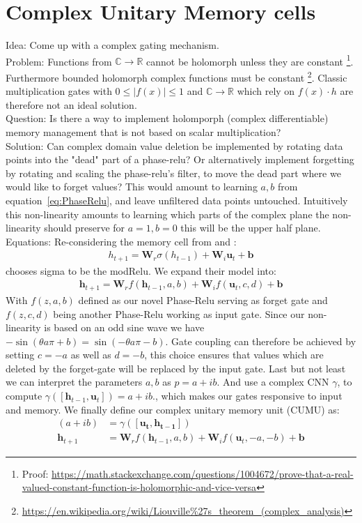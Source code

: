 \documentclass{article}
\begin{document}
\section{Complex Unitary Memory cells}
Idea: Come up with a complex gating mechanism. \\
Problem: Functions from $\mathbb{C} \rightarrow \mathbb{R}$ cannot be holomorph unless they are constant \cite[page 9]{Bornemann}\footnote{Proof: \url{https://math.stackexchange.com/questions/1004672/prove-that-a-real-valued-constant-function-is-holomorphic-and-vice-versa}}. Furthermore bounded holomorph complex functions must be constant \cite[page 38]{Bornemann}\footnote{\url{https://en.wikipedia.org/wiki/Liouville\%27s\_theorem\_(complex\_analysis)}}.
Classic multiplication gates with $0 \leq |f(x)| \leq 1$ and $\mathbb{C} \rightarrow \mathbb{R}$ which rely on $f(x) \cdot h$ are therefore not an ideal solution. \\
Question: Is there a way to implement holomporph (complex differentiable) memory management that is not based on scalar multiplication? \\
Solution: Can complex domain value deletion be implemented by rotating data points into the "dead" part of a phase-relu? Or alternatively implement forgetting by rotating and scaling the phase-relu's filter, to move the dead part where we would like to forget values? This would amount to learning $a,b$ from equation~\ref{eq:PhaseRelu}, and leave unfiltered data points untouched.
Intuitively this non-linearity amounts to learning which parts of the complex plane the non-linearity should preserve for $a=1, b=0$ this will be the upper half plane. \\
Equations:
Re-considering the memory cell from \cite{Pascanu} and \cite{Arjovsky}:
\begin{align}
h_{t+1} = \mathbf{W}_{r}\sigma(h_{t-1}) + \mathbf{W}_{i} \mathbf{u}_t + \mathbf{b}\end{align}
\cite{Arjovsky} chooses sigma to be the modRelu. We expand their model into:
\begin{align}
\mathbf{h}_{t+1} = \mathbf{W}_{r}f(\mathbf{h}_{t-1}, a, b) + \mathbf{W}_{i} f(\mathbf{u}_t,c,d) + \mathbf{b}
\end{align}
With $f(z, a, b)$ defined as our novel Phase-Relu serving as forget gate and $f(z, c, d)$ being another Phase-Relu working as input gate. Since our non-linearity is based on an odd sine wave we have $-\sin(\theta a \pi + b) = \sin(-\theta a \pi - b)$. Gate coupling can therefore be achieved by setting $c = -a$ as well as $d = - b$, this choice ensures that values which are deleted by the forget-gate will be replaced by the input gate.
Last but not least we can interpret the parameters $a, b$ as $p = a + ib$. And use a complex CNN $\gamma$, to compute $\gamma([\mathbf{h}_{t-1}, \mathbf{u}_t]) = a + ib.$, which makes our gates responsive to input and memory.
We finally define our complex unitary memory unit (CUMU) as:
\begin{align}
(a + ib) &= \gamma([\mathbf{u_t}, \mathbf{h_{t-1}}]) \\
\mathbf{h}_{t+1} &= \mathbf{W}_{r}f(\mathbf{h}_{t-1}, a, b) + \mathbf{W}_{i} f(\mathbf{u}_t,-a,-b) + \mathbf{b}
\end{align}
\end{document}
